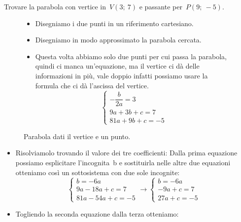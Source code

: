 \begin{esempio}
 Trovare la parabola con vertice in~\(V(3;~7)\) e passante per~\(P(9;~-5)\).

\begin{figure}[h!]
\begin{minipage}{.60\textwidth}
 \begin{itemize}
  \item Disegniamo i due punti in un riferimento cartesiano.
  \item Disegniamo in modo approssimato la parabola cercata.
  \item Questa volta abbiamo solo due punti per cui passa la parabola, quindi
   ci manca un'equazione, ma il vertice ci dà delle informazioni in più,
   vale doppio infatti possiamo usare la formula che ci dà l'ascissa del
   vertice.
\[\left\{\begin{array}{l}
  -\dfrac{b}{2a}=3\\
  9a+3b+c=7\\
  81a+9b+c=-5
\end{array}\right. \]
 \end{itemize}

\end{minipage}
\begin{minipage}{.40\textwidth}
\begin{inaccessibleblock}[Parabola di equazione \(y=x^2\).]
\centering
\scalebox{.7}{  \parabolaverticepunto}
  \caption{Parabola dati il vertice e un punto.}
\label{fig:parabola_parabolaverticepunto}
\end{inaccessibleblock}
\end{minipage}
\end{figure}

  \begin{itemize}
  \item Risolviamolo trovando il valore dei tre coefficienti:
   Dalla prima equazione possiamo esplicitare l'incognita~b e sostituirla
   nelle altre due equazioni otteniamo così un sottosistema con due sole
   incognite:
\[\left\{\begin{array}{l}
  b=-6a \\
  9a-18a+c=7\\
  81a-54a+c=-5
\end{array}\right. \rightarrow
\left\{\begin{array}{l}
  b=-6a \\
  -9a+c=7\\
  27a+c=-5
\end{array}\right.\]
  \item Togliendo la seconda equazione dalla terza otteniamo:


\end{itemize}
\end{esempio}
